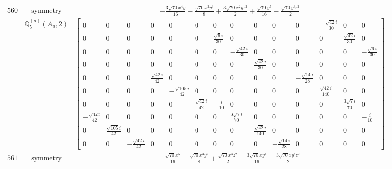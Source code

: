\documentclass[fleqn,8pt,landscape]{jsarticle}
\begin{document}
\begin{longtable}{ccc}
$ 560 $ & $ \text{symmetry} $ & $ - \frac{3 \sqrt{70} x^{4} y}{16} - \frac{\sqrt{70} x^{2} y^{3}}{8} + \frac{3 \sqrt{70} x^{2} y z^{2}}{2} + \frac{\sqrt{70} y^{5}}{16} - \frac{\sqrt{70} y^{3} z^{2}}{2} $ \\
$  $ & $ \mathbb{Q}_{5}^{(a)}(A_{u},2) $ & $ \begin{bmatrix} 0 & 0 & 0 & 0 & 0 & 0 & 0 & 0 & 0 & 0 & 0 & - \frac{\sqrt{42} i}{30} & 0 & 0 \\ 0 & 0 & 0 & 0 & 0 & 0 & \frac{\sqrt{6} i}{30} & 0 & 0 & 0 & 0 & 0 & \frac{\sqrt{42} i}{30} & 0 \\ 0 & 0 & 0 & 0 & 0 & 0 & 0 & - \frac{\sqrt{42} i}{30} & 0 & 0 & 0 & 0 & 0 & - \frac{\sqrt{6} i}{30} \\ 0 & 0 & 0 & 0 & 0 & 0 & 0 & 0 & \frac{\sqrt{42} i}{30} & 0 & 0 & 0 & 0 & 0 \\ 0 & 0 & 0 & \frac{\sqrt{42} i}{42} & 0 & 0 & 0 & 0 & 0 & 0 & - \frac{\sqrt{14} i}{28} & 0 & 0 & 0 \\ 0 & 0 & 0 & 0 & - \frac{\sqrt{105} i}{42} & 0 & 0 & 0 & 0 & 0 & 0 & \frac{\sqrt{42} i}{140} & 0 & 0 \\ 0 & 0 & 0 & 0 & 0 & \frac{\sqrt{42} i}{42} & - \frac{i}{10} & 0 & 0 & 0 & 0 & 0 & \frac{3 \sqrt{7} i}{70} & 0 \\ - \frac{\sqrt{42} i}{42} & 0 & 0 & 0 & 0 & 0 & 0 & \frac{3 \sqrt{7} i}{70} & 0 & 0 & 0 & 0 & 0 & - \frac{i}{10} \\ 0 & \frac{\sqrt{105} i}{42} & 0 & 0 & 0 & 0 & 0 & 0 & \frac{\sqrt{42} i}{140} & 0 & 0 & 0 & 0 & 0 \\ 0 & 0 & - \frac{\sqrt{42} i}{42} & 0 & 0 & 0 & 0 & 0 & 0 & - \frac{\sqrt{14} i}{28} & 0 & 0 & 0 & 0 \end{bmatrix} $ \\ \hline
$ 561 $ & $ \text{symmetry} $ & $ - \frac{\sqrt{70} x^{5}}{16} + \frac{\sqrt{70} x^{3} y^{2}}{8} + \frac{\sqrt{70} x^{3} z^{2}}{2} + \frac{3 \sqrt{70} x y^{4}}{16} - \frac{3 \sqrt{70} x y^{2} z^{2}}{2} $ \\

\end{longtable}
\end{document}
